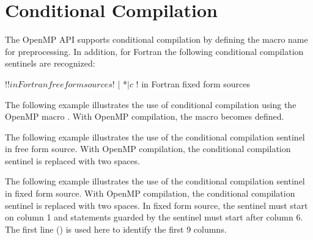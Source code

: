 \section{Conditional Compilation}
\label{sec:cond_compilation}

The OpenMP API supports conditional compilation by defining the 
 macro name for preprocessing.
In addition, for Fortran the following conditional compilation sentinels
are recognized:
\begin{boxedcode}
!$               ! in Fortran free form sources
!$ | *$ | c$     ! in Fortran fixed form sources
\end{boxedcode}

\begin{ccppspecific}
The following example illustrates the use of conditional compilation using 
the OpenMP macro . With OpenMP compilation, the  
macro becomes defined.

\end{ccppspecific}

\begin{fortranspecific}
The following example illustrates the use of the conditional compilation
sentinel in free form source. 
With OpenMP compilation, the conditional compilation sentinel \scode{!$} is
replaced with two spaces.


The following example illustrates the use of the conditional compilation 
sentinel in fixed form source. 
With OpenMP compilation, the conditional compilation sentinel \scode{!$} is
replaced with two spaces.
In fixed form source, the sentinel \scode{!$} must start on column 1 and
statements guarded by the sentinel must start after column 6.
The first line () is used here to identify the first 9 columns.

\end{fortranspecific}

